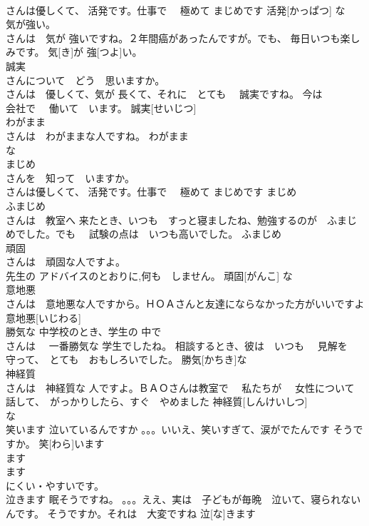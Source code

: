 \documentclass[8pt]{extreport}
\begin{document}
\begin{CJK}{UTF8}{min}
\\	さんは優しくて、 活発です。仕事で　 極めて まじめです	活発[かっぱつ]				な	
\\	気が強い。	
\\	さんは　気が 強いですね。２年間癌があったんですが。でも、 毎日いつも楽しみです。	気[き]が 強[つよ]い。			
\\	誠実	
\\	さんについて　どう　思いますか。 
\\	さんは　優しくて、気が 長くて、それに　とても　 誠実ですね。 今は　 
\\	会社で　 働いて　います。	誠実[せいじつ]					
\\	わがまま	
\\	さんは　わがままな人ですね。	わがまま			
\\	な		
\\	まじめ	
\\	さんを　知って　いますか。
\\	さんは優しくて、 活発です。仕事で　 極めて まじめです	まじめ						
\\	ふまじめ	
\\	さんは　教室へ 来たとき、いつも　すっと寝ましたね、勉強するのが　ふまじめでした。でも　 試験の点は　いつも高いでした。	ふまじめ						
\\	頑固	
\\	さんは　頑固な人ですよ。 
\\	先生の アドバイスのとおりに,何も　しません。	頑固[がんこ]				な	
\\	意地悪	
\\	さんは　意地悪な人ですから。ＨＯＡさんと友達にならなかった方がいいですよ	意地悪[いじわる]			
\\	勝気な	中学校のとき、学生の 中で　
\\	さんは　 一番勝気な 学生でしたね。 相談するとき、彼は　いつも　 見解を　守って、　とても　おもしろいでした。	勝気[かちき]な					
\\	神経質	
\\	さんは　神経質な 人ですよ。ＢＡＯさんは教室で　 私たちが　 女性について　 話して、　がっかりしたら、すぐ　やめました	神経質[しんけいしつ]			
\\	な	
\\	笑います	泣いているんですか 。。。いいえ、笑いすぎて、涙がでたんです そうですか。	笑[わら]います			
\\	ます　
\\	ます
\\	にくい・やすいです。
\\	泣きます	眠そうですね。 。。。ええ、実は　子どもが毎晩　泣いて、寝られないんです。 そうですか。それは　大変ですね	泣[な]きます				

\end{CJK}
\end{document}
